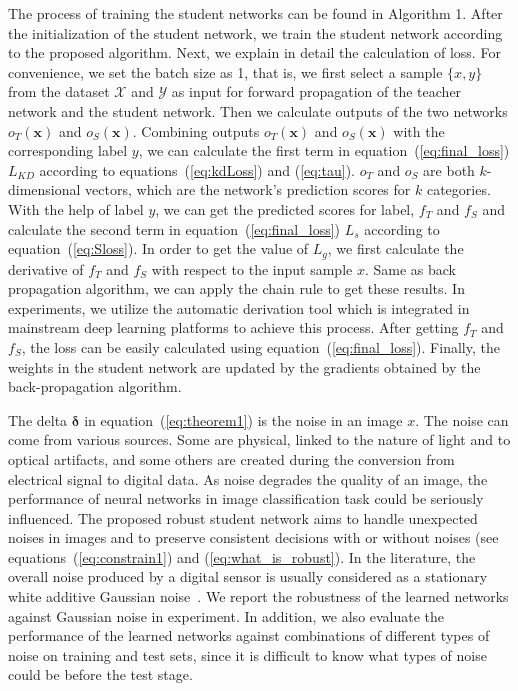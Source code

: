\documentclass[journal]{IEEEtran}
\newcommand{\Eref}[1]{equation~(\ref{#1})}
\newcommand{\Erefs}[1]{equations~(\ref{#1})}
\newcommand{\bx}{\bm{x}}
\newcommand{\bdelta}{\bm{\delta}}
\begin{document}
The process of training the student networks can be found in Algorithm 1. After the initialization of the student network, we train the student network according to the proposed algorithm. Next, we explain in detail the calculation of loss. For convenience, we set the batch size as 1, that is, we first select a sample $\{x,y\}$ from the dataset $\mathcal X$ and $\mathcal Y$ as input for forward propagation of the teacher network and the student network. Then we calculate outputs of the two networks $o_T(\bx)$ and $o_S(\bx)$. Combining outputs $o_T(\bx)$ and $o_S(\bx)$ with the corresponding label $y$, we can calculate the first term in \Eref{eq:final_loss} $L_{KD}$ according to \Erefs{eq:kdLoss} and (\ref{eq:tau}). $o_T$ and $o_S$ are both $k$-dimensional vectors, which are the network's prediction scores for $k$ categories. With the help of label $y$, we can get the predicted scores for label, $f_T$ and $f_S$ and calculate the second term in \Eref{eq:final_loss} $L_s$ according to \Eref{eq:Sloss}. In order to get the value of $L_g$, we first calculate the derivative of $f_T$ and $f_S$ with respect to the input sample $x$. Same as back propagation algorithm, we can apply the chain rule to get these results. In experiments, we utilize the automatic derivation tool which is integrated in mainstream deep learning platforms to achieve this process. After getting $f_T$ and $f_S$, the loss can be easily calculated using \Eref{eq:final_loss}. Finally, the weights in the student network are updated by the gradients obtained by the back-propagation algorithm.

The delta $\bdelta$ in \Eref{eq:theorem1} is the noise in an image $x$. The noise can come from various sources. Some are physical, linked to the nature of light and to optical artifacts, and some others are created during the conversion from electrical signal to digital data. As noise degrades the quality of an image, the performance of neural networks in image classification task could be seriously influenced. The proposed robust student network aims to handle unexpected noises in images and to preserve consistent decisions with or without noises (see \Erefs{eq:constrain1} and (\ref{eq:what_is_robust}). In the literature, the overall noise produced by a digital sensor is usually considered as a stationary white additive Gaussian noise~\cite{julliand2015image}. We report the robustness of the learned networks against Gaussian noise in experiment. In addition, we also evaluate the performance of the learned networks against combinations of different types of noise on training and test sets, since it is difficult to know what types of noise could be before the test stage.
\end{document}
